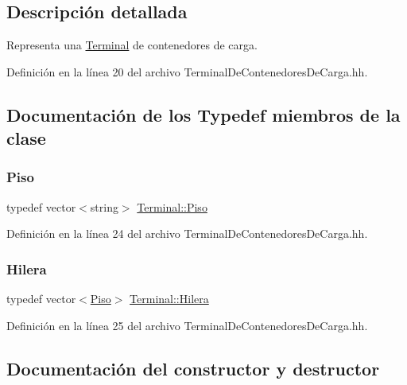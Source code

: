 \subsection{Descripción detallada}
Representa una \hyperlink{class_terminal}{Terminal} de contenedores de carga. 

Definición en la línea 20 del archivo Terminal\+De\+Contenedores\+De\+Carga.\+hh.



\subsection{Documentación de los \textquotesingle{}Typedef\textquotesingle{} miembros de la clase}
\mbox{\label{class_terminal_a06c48b71c1afa0f6cb9ec885fe53117c}} 
\subsubsection{\texorpdfstring{Piso}{Piso}}
{\footnotesize\ttfamily typedef vector$<$string$>$ \hyperlink{class_terminal_a06c48b71c1afa0f6cb9ec885fe53117c}{Terminal\+::\+Piso}\hspace{0.3cm}{\ttfamily [private]}}



Definición en la línea 24 del archivo Terminal\+De\+Contenedores\+De\+Carga.\+hh.

\mbox{\label{class_terminal_aba85ff115aaa21fc79271673ad4231b9}} 
\subsubsection{\texorpdfstring{Hilera}{Hilera}}
{\footnotesize\ttfamily typedef vector$<$\hyperlink{class_terminal_a06c48b71c1afa0f6cb9ec885fe53117c}{Piso}$>$ \hyperlink{class_terminal_aba85ff115aaa21fc79271673ad4231b9}{Terminal\+::\+Hilera}\hspace{0.3cm}{\ttfamily [private]}}



Definición en la línea 25 del archivo Terminal\+De\+Contenedores\+De\+Carga.\+hh.



\subsection{Documentación del constructor y destructor}
\mbox{\label{class_terminal_a696ee89f0fc7359b528c9f8f2aec064f}} 
